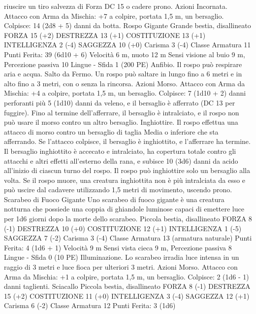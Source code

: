 \begin{multicols}{2}
riuscire un tiro salvezza di Forza DC 15 o cadere prono.
Azioni
Incornata. Attacco con Arma da Mischia: +7 a colpire, portata
1,5 m, un bersaglio.
Colpisce: 14 (2d8 + 5) danni da botta.
Rospo Gigante
Grande bestia, disallineato
FORZA 15 (+2)
DESTREZZA 13 (+1)
COSTITUZIONE 13 (+1)
INTELLIGENZA 2 (-4)
SAGGEZZA 10 (+0)
Carisma 3 (-4)
Classe Armatura 11
\hspace*{0pt}\hfill{Punti Ferita}: 39 (6d10 + 6)
Velocità 6 m, nuoto 12 m
Sensi visione al buio 9 m, Percezione passiva 10
Lingue -
Sfida 1 (200 PE)
Anfibio. Il rospo può respirare aria e acqua.
Salto da Fermo. Un rospo può saltare in lungo fino a 6 metri e in
alto fino a 3 metri, con o senza la rincorsa.
Azioni
Morso. Attacco con Arma da Mischia: +4 a colpire, portata 1,5
m, un bersaglio.
Colpisce: 7 (1d10 + 2) danni perforanti più 5 (1d10) danni da
veleno, e il bersaglio è afferrato (DC 13 per fuggire). Fino al
termine dell’afferrare, il bersaglio è intralciato, e il rospo non
può usare il morso contro un altro bersaglio.
Inghiottire. Il rospo effettua una attacco di morso contro un
bersaglio di taglia Media o inferiore che sta afferrando. Se
l’attacco colpisce, il bersaglio è inghiottito, e l’afferrare ha
termine. Il bersaglio inghiottito è accecato e intralciato, ha
copertura totale contro gli attacchi e altri effetti all’esterno della
rana, e subisce 10 (3d6) danni da acido all’inizio di ciascun turno
del rospo. Il rospo può inghiottire solo un bersaglio alla volta.
Se il rospo muore, una creatura inghiottita non è più intralciata
da esso e può uscire dal cadavere utilizzando 1,5 metri di
movimento, uscendo prono.
Scarabeo di Fuoco
Gigante
Uno scarabeo di fuoco gigante è una creatura notturna
che possiede una coppia di ghiandole luminose capaci
di emettere luce per 1d6 giorni dopo la morte dello
scarabeo.
Piccola bestia, disallineato
FORZA 8 (-1)
DESTREZZA 10 (+0)
COSTITUZIONE 12 (+1)
INTELLIGENZA 1 (-5)
SAGGEZZA 7 (-2)
Carisma 3 (-4)
Classe Armatura 13 (armatura naturale)
\hspace*{0pt}\hfill{Punti Ferita}: 4 (1d6 + 1)
Velocità 9 m
Sensi vista cieca 9 m, Percezione passiva 8
Lingue -
Sfida 0 (10 PE)
Illuminazione. Lo scarabeo irradia luce intensa in un raggio di 3
metri e luce fioca per ulteriori 3 metri.
Azioni
Morso. Attacco con Arma da Mischia: +1 a colpire, portata 1,5
m, un bersaglio.
Colpisce: 2 (1d6 - 1) danni taglienti.
Sciacallo
Piccola bestia, disallineato
FORZA 8 (-1)
DESTREZZA 15 (+2)
COSTITUZIONE 11 (+0)
INTELLIGENZA 3 (-4)
SAGGEZZA 12 (+1)
Carisma 6 (-2)
Classe Armatura 12
\hspace*{0pt}\hfill{Punti Ferita}: 3 (1d6)

\end{multicols}
